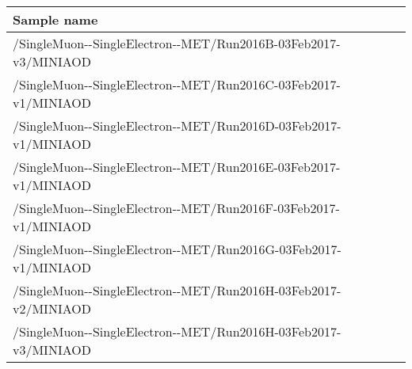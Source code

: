 \scriptsize
\begin{tabular}{lrr}
  \hline
  \textbf{Sample name} \\
  \hline
  \ttfamily /SingleMuon-{}-SingleElectron-{}-MET/Run2016B-03Feb2017-v3/MINIAOD \\
  \ttfamily /SingleMuon-{}-SingleElectron-{}-MET/Run2016C-03Feb2017-v1/MINIAOD \\
  \ttfamily /SingleMuon-{}-SingleElectron-{}-MET/Run2016D-03Feb2017-v1/MINIAOD \\
  \ttfamily /SingleMuon-{}-SingleElectron-{}-MET/Run2016E-03Feb2017-v1/MINIAOD \\
  \ttfamily /SingleMuon-{}-SingleElectron-{}-MET/Run2016F-03Feb2017-v1/MINIAOD \\
  \ttfamily /SingleMuon-{}-SingleElectron-{}-MET/Run2016G-03Feb2017-v1/MINIAOD \\
  \ttfamily /SingleMuon-{}-SingleElectron-{}-MET/Run2016H-03Feb2017-v2/MINIAOD \\
  \ttfamily /SingleMuon-{}-SingleElectron-{}-MET/Run2016H-03Feb2017-v3/MINIAOD \\
  \hline
\end{tabular}

